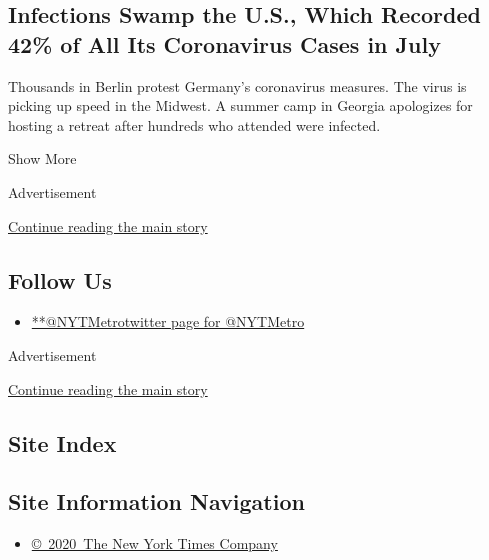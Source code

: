 \begin{enumerate}
  \hypertarget{infections-swamp-the-us-which-recorded-42-of-all-its-coronavirus-cases-in-july}{%
  \subsection{Infections Swamp the U.S., Which Recorded 42\% of All Its
  Coronavirus Cases in
  July}\label{infections-swamp-the-us-which-recorded-42-of-all-its-coronavirus-cases-in-july}}

  Thousands in Berlin protest Germany's coronavirus measures. The virus
  is picking up speed in the Midwest. A summer camp in Georgia
  apologizes for hosting a retreat after hundreds who attended were
  infected.
\end{enumerate}

Show More

Advertisement

\protect\hyperlink{after-mid2}{Continue reading the main story}

\hypertarget{follow-us}{%
\subsection{Follow Us}\label{follow-us}}

\begin{itemize}
\tightlist
\item
  \href{https://twitter.com/NYTMetro}{**@NYTMetrotwitter page for
  @NYTMetro}
\end{itemize}

Advertisement

\protect\hyperlink{after-mktg}{Continue reading the main story}

\hypertarget{site-index}{%
\subsection{Site Index}\label{site-index}}

\hypertarget{site-information-navigation}{%
\subsection{Site Information
Navigation}\label{site-information-navigation}}

\begin{itemize}
\tightlist
\item
  \href{https://help.nytimes3xbfgragh.onion/hc/en-us/articles/115014792127-Copyright-notice}{©~2020~The
  New York Times Company}
\end{itemize}

